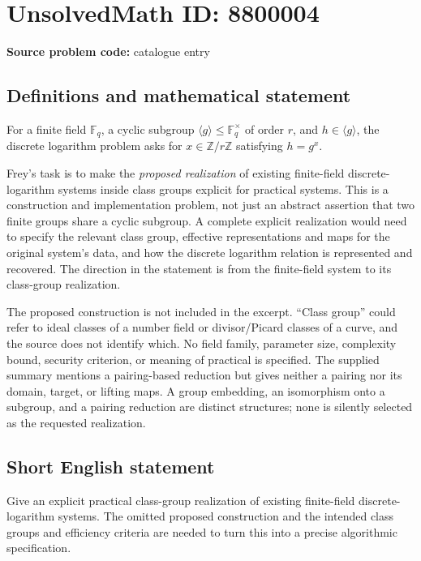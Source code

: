 \documentclass[11pt]{article}
\newcommand{\Z}{\mathbb{Z}}
\newcommand{\F}{\mathbb{F}}
\begin{document}
\section*{UnsolvedMath ID: 8800004}
\textbf{Source problem code:} catalogue entry
\subsection{Definitions and mathematical statement}
For a finite field \(\F_q\), a cyclic subgroup \(\langle g\rangle\leq\F_q^\times\) of order \(r\), and \(h\in\langle g\rangle\), the discrete logarithm problem asks for \(x\in\Z/r\Z\) satisfying \(h=g^x\).

Frey's task is to make the \emph{proposed realization} of existing finite-field discrete-logarithm systems inside class groups explicit for practical systems. This is a construction and implementation problem, not just an abstract assertion that two finite groups share a cyclic subgroup. A complete explicit realization would need to specify the relevant class group, effective representations and maps for the original system's data, and how the discrete logarithm relation is represented and recovered. The direction in the statement is from the finite-field system to its class-group realization.

The proposed construction is not included in the excerpt. ``Class group'' could refer to ideal classes of a number field or divisor/Picard classes of a curve, and the source does not identify which. No field family, parameter size, complexity bound, security criterion, or meaning of practical is specified. The supplied summary mentions a pairing-based reduction but gives neither a pairing nor its domain, target, or lifting maps. A group embedding, an isomorphism onto a subgroup, and a pairing reduction are distinct structures; none is silently selected as the requested realization.
\subsection{Short English statement}
Give an explicit practical class-group realization of existing finite-field discrete-logarithm systems. The omitted proposed construction and the intended class groups and efficiency criteria are needed to turn this into a precise algorithmic specification.
\end{document}

